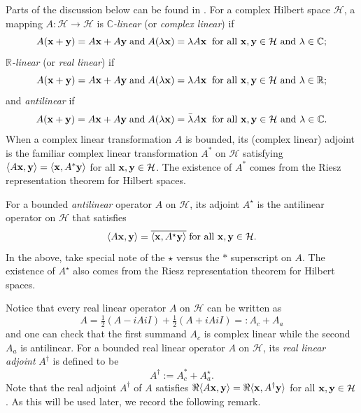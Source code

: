 \documentclass{dis}
\theoremstyle{plain}
\theoremstyle{definition}
\def\C{\mathbb{C}}
\def\R{\mathbb{R}}
\renewcommand{\vec}[1]{{\bf #1}}
\newcommand{\0}{{\color{lightgray}0}}
\begin{document}
Parts of the discussion below can be found in \cite{MR2749452}. For a complex Hilbert space $\mathcal{H}$, 
a mapping $A: \mathcal{H} \to \mathcal{H}$ is {\em $\C$-linear} (or {\em complex linear}) if
$$A (\vec{x} + \vec{y}) = A \vec{x} + A \vec{y} \; \mbox{and} \; A(\lambda \vec{x}) = \lambda A \vec{x} \;  \; \mbox{for all $\vec{x}, \vec{y} \in \mathcal{H}$ and $\lambda \in \C$};$$
{\em $\R$-linear} (or {\em real linear}) if 
$$A (\vec{x} + \vec{y}) = A \vec{x} + A \vec{y} \; \mbox{and} \; A(\lambda \vec{x}) = \lambda A \vec{x}  \;  \; \mbox{for all $\vec{x}, \vec{y} \in \mathcal{H}$ and $\lambda \in \R$};$$
and {\em antilinear} if 
$$A (\vec{x} + \vec{y}) = A \vec{x} + A \vec{y} \; \mbox{and} \; A(\lambda \vec{x}) = \bar \lambda A \vec{x}  \;  \; \mbox{for all $\vec{x}, \vec{y} \in \mathcal{H}$ and $\lambda \in \C$}.$$
When a complex linear transformation $A$ is bounded, its (complex linear) adjoint is the familiar complex linear transformation $A^{*}$ on $\mathcal{H}$ satisfying $\langle A \vec{x}, \vec{y}\rangle = \langle \vec{x}, A^{*} \vec{y}\rangle$ for all $\vec{x}, \vec{y} \in \mathcal{H}$. The existence of $A^{*}$ comes from the Riesz representation theorem for Hilbert spaces. 


For a bounded {\em antilinear} operator $A$ on $\mathcal{H}$, its adjoint $A^{\star}$ is the antilinear operator on $\mathcal{H}$ that satisfies 
\begin{equation}\label{oooOOkkkKKKK}
\langle A \vec{x}, \vec{y}\rangle = \overline{\langle \vec{x}, A^{\star} \vec{y}\rangle} \; \mbox{for all $\vec{x}, \vec{y} \in \mathcal{H}$.}
\end{equation} 
In the above, take special note of the $\star$ versus the $\ast$ superscript on $A$. The existence of $A^{\star}$ also comes from the Riesz representation theorem for Hilbert spaces. 


 Notice that every real linear operator $A$ on $\mathcal{H}$ can be written as 
\begin{equation}\label{7796316}
A = \tfrac{1}{2} (A - i A i I) + \tfrac{1}{2} (A + i A iI) =: A_{c} + A_{a}
\end{equation}
 and one can check that the first summand $A_{c}$ is complex linear while the second $A_{a}$ is antilinear. For a bounded real linear operator $A$ on $\mathcal{H}$, its {\em real linear adjoint}
$A^{\dagger}$ is defined to be 
\begin{equation}\label{realadjoint}
A^{\dagger} := A_{c}^{*} + A_{a}^{\star}.
\end{equation}
 Note that the real adjoint $A^{\dagger}$ of $A$ satisfies $\Re \langle A \vec{x}, \vec{y}\rangle = \Re \langle \vec{x}, A^{\dagger} \vec{y}\rangle$ for all $\vec{x}, \vec{y} \in \mathcal{H}$. As this will be used later, we record the following remark.
 
\end{document}
